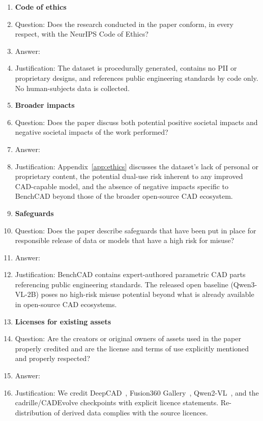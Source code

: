 \begin{enumerate}
\item {\bf Code of ethics}
    \item[] Question: Does the research conducted in the paper conform, in every respect, with the NeurIPS Code of Ethics?
    \item[] Answer: \answerYes{}
    \item[] Justification: The dataset is procedurally generated, contains no PII or proprietary designs, and references public engineering standards by code only. No human-subjects data is collected.


\item {\bf Broader impacts}
    \item[] Question: Does the paper discuss both potential positive societal impacts and negative societal impacts of the work performed?
    \item[] Answer: \answerYes{}
    \item[] Justification: Appendix~\ref{app:ethics} discusses the dataset's lack of personal or proprietary content, the potential dual-use risk inherent to any improved CAD-capable model, and the absence of negative impacts specific to BenchCAD beyond those of the broader open-source CAD ecosystem.

\item {\bf Safeguards}
    \item[] Question: Does the paper describe safeguards that have been put in place for responsible release of data or models that have a high risk for misuse?
    \item[] Answer: \answerNA{}
    \item[] Justification: BenchCAD contains expert-authored parametric CAD parts referencing public engineering standards. The released open baseline (Qwen3-VL-2B) poses no high-risk misuse potential beyond what is already available in open-source CAD ecosystems.

\item {\bf Licenses for existing assets}
    \item[] Question: Are the creators or original owners of assets used in the paper properly credited and are the license and terms of use explicitly mentioned and properly respected?
    \item[] Answer: \answerYes{}
    \item[] Justification: We credit DeepCAD~\citep{Wu2021}, Fusion360 Gallery~\citep{Willis2021fusion}, Qwen2-VL~\citep{Qwen2VL}, and the cadrille/CADEvolve checkpoints with explicit licence statements. Re-distribution of derived data complies with the source licences.


\end{enumerate}
